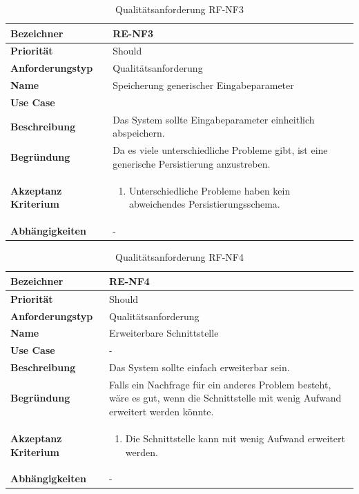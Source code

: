 \begin{table}[ht]
\centering
  \begin{tabular}{ l | p{8cm} }
	\hline
	\rowcolor{gray}
	\textbf{Bezeichner}&	\textbf{RE-NF3}\\ \hline
	\textbf{Priorität} 		&	Should\\ \hline
	\textbf{Anforderungstyp}	&	Qualitätsanforderung\\ \hline
	\textbf{Name} 			&	Speicherung generischer Eingabeparameter\\ \hline
	\textbf{Use Case} 		&	\nameref{table:use_case_1}\\ \hline
	\textbf{Beschreibung} 	&	Das System sollte Eingabeparameter einheitlich abspeichern.\\ \hline
	\textbf{Begründung} 		&	Da es viele unterschiedliche Probleme gibt, ist eine generische Persistierung anzustreben.\\ \hline
	\textbf{Akzeptanz Kriterium}	&	\begin{enumerate}
					\item Unterschiedliche Probleme haben kein abweichendes Persistierungsschema.
					\end{enumerate}
					\\ \hline
	\textbf{Abhängigkeiten} 	&	-\\ \hline
  \end{tabular}
   \caption{Qualitätsanforderung RF-NF3}\label{table:req_nf_3}
\end{table}

\begin{table}[ht]
\centering
  \begin{tabular}{ l | p{8cm} }
	\hline
	\rowcolor{gray}
	\textbf{Bezeichner}&	\textbf{RE-NF4}\\ \hline
	\textbf{Priorität} 		&	Should\\ \hline
	\textbf{Anforderungstyp}	&	Qualitätsanforderung\\ \hline
	\textbf{Name} 			&	Erweiterbare Schnittstelle\\ \hline
	\textbf{Use Case} 		&	-\\ \hline
	\textbf{Beschreibung} 	&	Das System sollte einfach erweiterbar sein.\\ \hline
	\textbf{Begründung} 		&	Falls ein Nachfrage für ein anderes Problem besteht, wäre es gut, wenn die Schnittstelle mit wenig Aufwand erweitert werden könnte.\\ \hline
	\textbf{Akzeptanz Kriterium}	&	\begin{enumerate}
					\item Die Schnittstelle kann mit wenig Aufwand erweitert werden.
					\end{enumerate}
					\\ \hline
	\textbf{Abhängigkeiten} 	&	-\\ \hline
  \end{tabular}
   \caption{Qualitätsanforderung RF-NF4}\label{table:req_nf_4}
\end{table}

